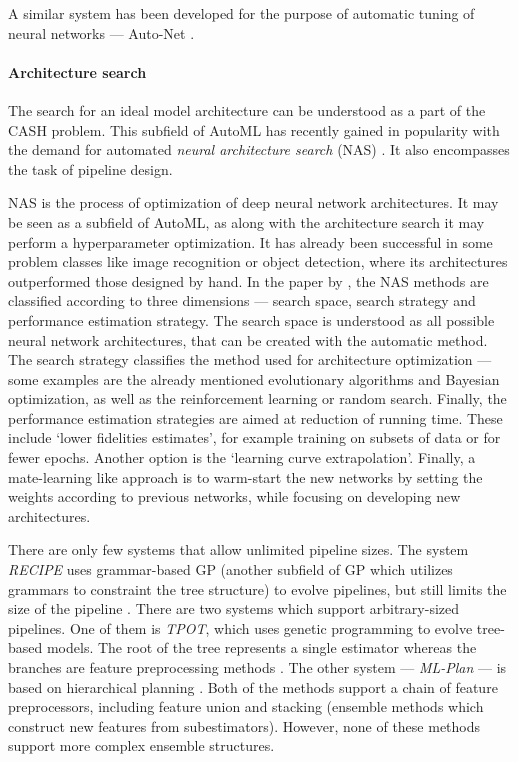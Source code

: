 A similar system has been developed for the purpose of automatic tuning of neural
networks --- Auto-Net \citep{pmlr-v64-mendoza_towards_2016}.

\paragraph{Architecture search}
The search for an ideal model architecture can be understood as a part of the
CASH problem. This subfield of AutoML has recently gained in popularity with the
demand for automated \emph{neural architecture search} (NAS)
\citep{2018arXiv180805377E}. It also encompasses the task of pipeline design.

NAS is the process of optimization of deep neural network architectures. It may be
seen as a subfield of AutoML, as along with the architecture search it may perform
a hyperparameter optimization. It has already been
successful in some problem classes like image recognition or object detection, where
its architectures outperformed those designed by hand. In the paper by 
\cite{2018arXiv180805377E}, the NAS methods are classified according to three
dimensions --- search space, search strategy and performance estimation strategy.
The search space is understood as all possible neural network architectures, that
can be created with the automatic method. The search strategy classifies the method
used for architecture optimization --- some examples are the already mentioned
evolutionary algorithms and Bayesian optimization, as well as the reinforcement
learning or random search. Finally, the performance estimation strategies are aimed
at reduction of running time. These include `lower fidelities estimates', for example
training on subsets of data or for fewer epochs. Another option is the `learning
curve extrapolation'. Finally, a mate-learning like approach is to warm-start the
new networks by setting the weights according to previous networks, while focusing
on developing new architectures.

There are only few systems that allow unlimited pipeline sizes. The system
\emph{RECIPE} uses grammar-based GP (another subfield of GP which utilizes grammars
to constraint the tree structure) to evolve pipelines, but still limits the
size of the pipeline \citep{10.1007/978-3-319-55696-3_16}.
There are two systems which support arbitrary-sized pipelines. One of them is
\emph{TPOT}, which uses genetic programming to evolve tree-based models. The
root of the tree represents a single estimator whereas the branches are feature
preprocessing methods \citep{Olson2016EvoBio}.
The other system --- \emph{ML-Plan} --- is based on hierarchical planning
\citep{Mohr2018}. Both of the methods support a chain of feature preprocessors,
including feature union and stacking (ensemble methods which construct new
features from subestimators). However, none of these methods support more
complex ensemble structures.
